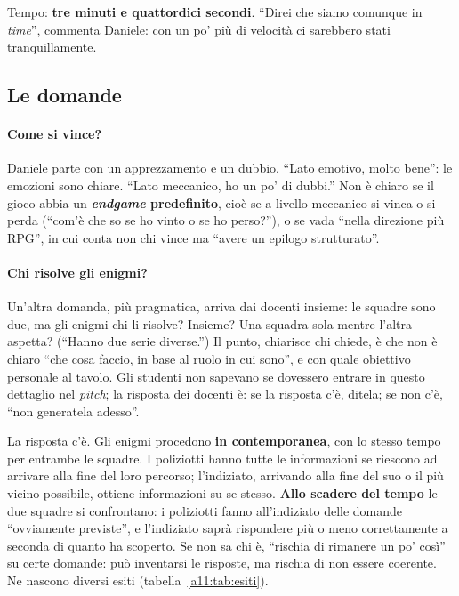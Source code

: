 Tempo: \textbf{tre minuti e quattordici secondi}. ``Direi che siamo comunque in
\emph{time}'', commenta Daniele: con un po' più di velocità ci sarebbero stati
tranquillamente.

\subsection{Le domande}

\paragraph{Come si vince?} Daniele parte con un apprezzamento e un dubbio. ``Lato
emotivo, molto bene'': le emozioni sono chiare. ``Lato meccanico, ho un po' di dubbi.''
Non è chiaro se il gioco abbia un \textbf{\emph{endgame} predefinito}, cioè se a livello
meccanico si vinca o si perda (``com'è che so se ho vinto o se ho perso?''), o se vada
``nella direzione più RPG'', in cui conta non chi vince ma ``avere un epilogo
strutturato''.

\paragraph{Chi risolve gli enigmi?} Un'altra domanda, più pragmatica, arriva dai docenti
insieme: le squadre sono due, ma gli enigmi chi li risolve? Insieme? Una squadra sola
mentre l'altra aspetta? (``Hanno due serie diverse.'') Il punto, chiarisce chi chiede, è
che non è chiaro ``che cosa faccio, in base al ruolo in cui sono'', e con quale obiettivo
personale al tavolo. Gli studenti non sapevano se dovessero entrare in questo dettaglio
nel \emph{pitch}; la risposta dei docenti è: se la risposta c'è, ditela; se non c'è,
``non generatela adesso''.

La risposta c'è. Gli enigmi procedono \textbf{in contemporanea}, con lo stesso tempo per
entrambe le squadre. I poliziotti hanno tutte le informazioni se riescono ad arrivare
alla fine del loro percorso; l'indiziato, arrivando alla fine del suo o il più vicino
possibile, ottiene informazioni su se stesso. \textbf{Allo scadere del tempo} le due
squadre si confrontano: i poliziotti fanno all'indiziato delle domande ``ovviamente
previste'', e l'indiziato saprà rispondere più o meno correttamente a seconda di quanto
ha scoperto. Se non sa chi è, ``rischia di rimanere un po' così'' su certe domande:
può inventarsi le risposte, ma rischia di non essere coerente. Ne nascono diversi esiti
(tabella~\ref{a11:tab:esiti}).

